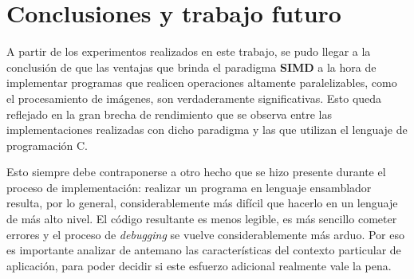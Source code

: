 \documentclass[a4paper]{article}
\newenvironment{codesnippet}{%
	\begin{Sbox}\begin{minipage}{\textwidth}\sffamily\small}%
	{\end{minipage}\end{Sbox}%
		\begin{center}%
		\vspace{-0.4cm}\colorbox{litegrey}{\TheSbox}\end{center}\vspace{0.3cm}}
\begin{document}
%









%
%

\section{Conclusiones y trabajo futuro}

    A partir de los experimentos realizados en este trabajo, se pudo llegar a la conclusión de que las ventajas que brinda el paradigma \textbf{SIMD} a la hora de implementar programas que realicen operaciones altamente paralelizables, como el procesamiento de imágenes, son verdaderamente significativas. Esto queda reflejado en la gran brecha de rendimiento que se observa entre las implementaciones realizadas con dicho paradigma y las que utilizan el lenguaje de programación C.

    Esto siempre debe contraponerse a otro hecho que se hizo presente durante el proceso de implementación: realizar un programa en lenguaje ensamblador resulta, por lo general, considerablemente más difícil que hacerlo en un lenguaje de más alto nivel. El código resultante es menos legible, es más sencillo cometer errores y el proceso de \emph{debugging} se vuelve considerablemente más arduo. Por eso es importante analizar de antemano las características del contexto particular de aplicación, para poder decidir si este esfuerzo adicional realmente vale la pena.
\end{document}
